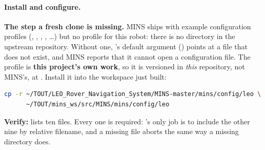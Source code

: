 \paragraph{Install and configure.}
\textbf{The step a fresh clone is missing.} MINS ships with example
configuration profiles (, , ,
, \dots) but no profile for this robot: there is no
 directory in the upstream repository. Without one,
's default argument () points at a file
that does not exist, and MINS reports that it cannot open a configuration
file. The  profile is \textbf{this project's own work}, so it is
versioned in \emph{this} repository, not MINS's, at
. Install it
into the workspace just built:
\begin{lstlisting}[language=bash]
cp -r ~/TOUT/LEO_Rover_Navigation_System/MINS-master/mins/config/leo \
      ~/TOUT/mins_ws/src/MINS/mins/config/leo
\end{lstlisting}
\textbf{Verify:}  lists ten
files. Every one is required: \code{config.yaml}'s only job is to include the
other nine by relative filename, and a missing file aborts the same way a
missing \code{leo/} directory does.

